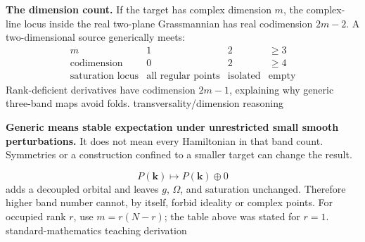 \documentclass[11pt,a4paper]{article}
\newcommand{\esrctext}[1]{\textcolor{ProposalGreen}{\scriptsize\sffamily [E] #1}}
\newcommand{\esrc}[1]{\ifmmode\text{\esrctext{#1}}\else\esrctext{#1}\fi}
\newcommand{\calctext}{\textcolor{Slate}{\scriptsize\sffamily [Calc] standard-mathematics teaching derivation}}
\newcommand{\calc}{\ifmmode\text{\calctext}\else\calctext\fi}
\begin{document}
\begin{extensionbox}
\textbf{The dimension count.} If the target has complex dimension $m$,
the complex-line locus inside the real two-plane Grassmannian has real
codimension $2m-2$. A two-dimensional source generically meets:
\[
\begin{array}{c|ccc}
m & 1 & 2 & \ge3\\ \hline
\text{codimension} &0&2&\ge4\\
\text{saturation locus} &\text{all regular points}&\text{isolated}&\text{empty}
\end{array}
\]
Rank-deficient derivatives have codimension $2m-1$, explaining why generic
three-band maps avoid folds. \esrc{transversality/dimension reasoning}
\end{extensionbox}

\textbf{Generic means stable expectation under unrestricted small smooth
perturbations.} It does not mean every Hamiltonian in that band count.
Symmetries or a construction confined to a smaller target can change the result.
\begin{cautionbox}
\[
P(\mathbf k)\longmapsto P(\mathbf k)\oplus 0
\]
adds a decoupled orbital and leaves $g$, $\Omega$, and saturation unchanged.
Therefore higher band number cannot, by itself, forbid ideality or complex
points. For occupied rank $r$, use $m=r(N-r)$; the table above was stated for
$r=1$. \calc
\end{cautionbox}
\end{document}
